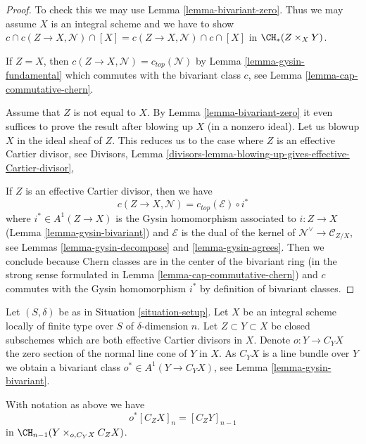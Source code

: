 \begin{proof}
To check this we may use Lemma \ref{lemma-bivariant-zero}.
Thus we may assume $X$ is an integral scheme and we have to show
$c \cap c(Z \to X, \mathcal{N}) \cap [X] =
c(Z \to X, \mathcal{N}) \cap c \cap [X]$ in $\CH_*(Z \times_X Y)$.

\medskip\noindent
If $Z = X$, then $c(Z \to X, \mathcal{N}) = c_{top}(\mathcal{N})$ by
Lemma \ref{lemma-gysin-fundamental} which commutes
with the bivariant class $c$, see Lemma \ref{lemma-cap-commutative-chern}.

\medskip\noindent
Assume that $Z$ is not equal to $X$. By Lemma \ref{lemma-bivariant-zero}
it even suffices to prove the result after blowing up $X$ (in a nonzero ideal).
Let us blowup $X$ in the ideal sheaf of $Z$. This reduces us to the case
where $Z$ is an effective Cartier divisor, see
Divisors, Lemma
\ref{divisors-lemma-blowing-up-gives-effective-Cartier-divisor},

\medskip\noindent
If $Z$ is an effective Cartier divisor, then we have
$$
c(Z \to X, \mathcal{N}) =
c_{top}(\mathcal{E}) \circ i^*
$$
where $i^* \in A^1(Z \to X)$ is the Gysin homomorphism
associated to $i : Z \to X$ (Lemma \ref{lemma-gysin-bivariant})
and $\mathcal{E}$ is the dual of the kernel of
$\mathcal{N}^\vee \to \mathcal{C}_{Z/X}$, see
Lemmas \ref{lemma-gysin-decompose} and \ref{lemma-gysin-agrees}.
Then we conclude because Chern classes are in the center of the
bivariant ring (in the strong sense formulated in
Lemma \ref{lemma-cap-commutative-chern}) and $c$ commutes
with the Gysin homomorphism $i^*$ by definition of bivariant classes.
\end{proof}

\noindent
Let $(S, \delta)$ be as in Situation \ref{situation-setup}. Let $X$ be an
integral scheme locally of finite type over $S$ of $\delta$-dimension $n$.
Let $Z \subset Y \subset X$ be closed subschemes which are both effective
Cartier divisors in $X$. Denote $o : Y \to C_Y X$ the zero section of the
normal line cone of $Y$ in $X$. As $C_YX$ is a line bundle over $Y$
we obtain a bivariant class $o^* \in A^1(Y \to C_YX)$, see
Lemma \ref{lemma-gysin-bivariant}.

\begin{lemma}
\label{lemma-relation-normal-cones}
With notation as above we have
$$
o^*[C_ZX]_n = [C_Z Y]_{n - 1}
$$
in $\CH_{n - 1}(Y \times_{o, C_Y X} C_ZX)$.
\end{lemma}

